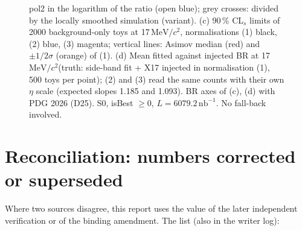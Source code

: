 \documentclass[11pt,a4paper]{article}
\newcommand{\nbinv}{\ensuremath{\mathrm{nb}^{-1}}\xspace}
\newcommand{\MeVcc}{\ensuremath{\mathrm{MeV}/c^{2}}\xspace}
\begin{document}
\begin{figure}[H]
{pol2 in the logarithm of the ratio (open blue); grey crosses: divided by the locally smoothed simulation (variant). (c) 90\,\% CL$_s$ limits of 2000
background-only toys at 17\,\MeVcc, normalisations (1) black, (2) blue, (3) magenta; vertical lines: Asimov median (red) and $\pm1/2\sigma$ (orange) of (1).
(d) Mean fitted against injected BR at 17\,\MeVcc (truth: side-band fit + X17 injected in normalisation (1), 500 toys per point); (2) and (3) read the same
counts with their own $\eta$ scale (expected slopes 1.185 and 1.093). BR axes of (c), (d) with PDG 2026 (D25). S0, isBest $\ge0$, $L=6079.2\,\nbinv$. No fall-back involved.}
\label{fig:x17c}
\end{figure}

\section{Reconciliation: numbers corrected or superseded}
\label{app:recon}
Where two sources disagree, this report uses the value of the later independent verification or of the binding amendment. The list (also in the
writer log):
\end{document}
